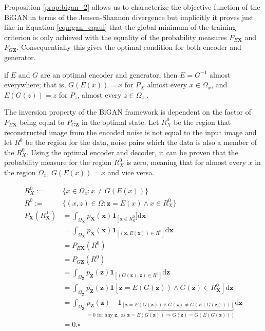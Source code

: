 {Proposition \ref{prop:bigan_2} allows us to characterize the objective function of the BiGAN in
terms of the Jensen-Shannon divergence but implicitly it proves just like in Equation
\ref{eqn:gan_eqaul} that the global minimum of the training criterion is only achieved with the
equality of the probability measures $P_{E\mathbf{X}}$ and $P_{G\mathbf{Z}}$. Consequentially this
gives the optimal condition for both encoder and generator. 

\begin{theorem}
    \label{th:bigan_inv}
    if $E$ and $G$ are an optimal encoder and generator, then $E = G^{-1}$ almost everywhere; that is,
    $G(E(x)) = x$ for $P_X$ almost every $x \in \Omega_x$, and $E(G(z)) = z$ for $P_z$, almost every
    $z \in \Omega_z$ .
\end{theorem}

The inversion property of the BiGAN framework is dependent on the factor of $P_{E\mathbf{X}}$ being
equal to $P_{G\mathbf{Z}}$ in the optimal state. Let $R_{X}^{0}$ be the region that
reconstructed image from the encoded noise is not equal to the input image and let $R^{0}$ be the
region for the data, noise pairs which the data is also a member of the $R^{0}_{X}$. Using the
optimal encoder and decoder, it can be proven that the probability measure for the region
$R^{0}_{X}$ is zero, meaning that for almost every $x$ in the region $\Omega_x$, $G(E(x)) = x$ and
vice versa.

\begin{align}
    R^{0}_{X} :=& \{x \in \Omega_x : x \neq G(E(x))\} \\[5pt]
    R^{0} :=& \{(x,z) \in \Omega : \mathbf{z} = E(x) \land x \in R^{0}_{X}\}\\[5pt]
    P_{\mathbf{X}}\left(R_{\mathbf{X}}^{0}\right) &=\int_{\Omega_{\mathbf{X}}} p_{\mathbf{X}}(\mathbf{x}) \mathbf{1}_{\left[\mathbf{x} \in R_{\mathbf{x}}^{0}\right.} ] \mathrm{d} \mathbf{x} \\[5pt]
    &=\int_{\Omega_{\mathbf{X}}} p_{\mathbf{X}}(\mathbf{x}) \mathbf{1}_{\left[(\mathbf{x}, E(\mathbf{x})) \in R^{0}\right]} \mathrm{d} \mathbf{x} \\[5pt]
    & =P_{E \mathbf{X}}\left(R^{0}\right)\\[5pt]
    & =P_{G \mathbf{Z}}\left(R^{0}\right)\\[5pt]
    & =\int_{\Omega_{\mathbf{Z}}} p_{\mathbf{Z}}(\mathbf{z}) \mathbf{1}_{\left[(G(\mathbf{z}), \mathbf{z}) \in R^{0}\right]} \mathrm{d} \mathbf{z}\\[5pt]
    & =\int_{\Omega_{\mathbf{Z}}} p_{\mathbf{Z}}(\mathbf{z}) \mathbf{1}\left[\mathbf{z}=E(G(\mathbf{z})) \wedge G(\mathbf{z}) \in R_{\mathbf{X}}^{0}\right] \mathrm{d} \mathbf{z}\\[5pt]
    & =\int_{\Omega_{\mathbf{Z}}} \underbrace{p_{\mathbf{Z}}(\mathbf{z}) \quad \mathbf{1}_{[\mathbf{z}=E(G(\mathbf{z})) \wedge G(\mathbf{z}) \neq G(E(G(\mathbf{z})))]}}_{=0 \text { for any } \mathbf{z}, \text { as } \mathbf{z}=E(G(\mathbf{z})) \Longrightarrow G(\mathbf{z})=G(E(G(\mathbf{z})))} \mathrm{d} \mathbf{z}\\[5pt]
    &= 0. \square  \\[5pt]
\end{align}

}
